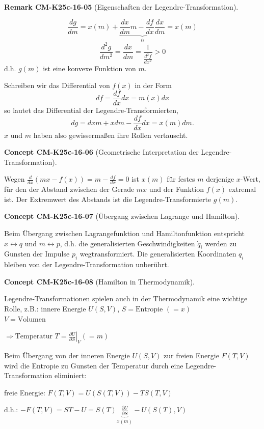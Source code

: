 \documentclass[10pt, letterpaper]{article}
\newcommand{\CustomHeading}[3]{%
  \par\medskip\noindent%
  \textbf{#1 #2} \textnormal{(#3)}.\enskip%
}
\newenvironment{REM}[2]{\CustomHeading{Remark}{#1}{#2}}{}
\newenvironment{CONC}[2]{\CustomHeading{Concept}{#1}{#2}}{}
\begin{document}
\begin{REM}{CM-K25c-16-05}{Eigenschaften der Legendre-Transformation}
\[
\frac{dg}{dm} = x(m) + \underbrace{\frac{dx}{dm}m - \frac{df}{dx}\frac{dx}{dm}}_{0} = x(m)
\]
\[
\frac{d^2g}{dm^2} = \frac{dx}{dm} = \frac{1}{\frac{d^2f}{dx^2}} > 0
\]
d.h. $g(m)$ ist eine konvexe Funktion von $m$.

Schreiben wir das Differential von $f(x)$ in der Form
\[
df = \frac{df}{dx}dx = m(x)dx
\]
so lautet das Differential der Legendre-Transformierten,
\[
dg = dxm + xdm - \frac{df}{dx}dx = x(m)dm.
\]
$x$ und $m$ haben also gewissermaßen ihre Rollen vertauscht.
\end{REM}

\begin{CONC}{CM-K25c-16-06}{Geometrische Interpretation der Legendre-Transformation}
Wegen $\frac{d}{dx}(mx-f(x))=m-\frac{df}{dx}=0$ ist $x(m)$ für festes $m$ derjenige $x$-Wert, für den der Abstand zwischen der Gerade $mx$ und der Funktion $f(x)$ extremal ist. Der Extremwert des Abstands ist die Legendre-Transformierte $g(m)$.
\end{CONC}

\begin{CONC}{CM-K25c-16-07}{Übergang zwischen Lagrange und Hamilton}
Beim Übergang zwischen Lagrangefunktion und Hamiltonfunktion entspricht $x \leftrightarrow q$ und $m \leftrightarrow p$, d.h. die generalisierten Geschwindigkeiten $\dot{q}_i$ werden zu Gunsten der Impulse $p_i$ wegtransformiert. Die generalisierten Koordinaten $q_i$ bleiben von der Legendre-Transformation unberührt.
\end{CONC}

\begin{CONC}{CM-K25c-16-08}{Hamilton in Thermodynamik}
Legendre-Transformationen spielen auch in der Thermodynamik eine wichtige Rolle, z.B.:
innere Energie $U(S,V)$, $S = \text{Entropie } (=x)$\\
$V = \text{Volumen}$

$\Rightarrow \text{Temperatur } T = \left.\frac{\partial U}{\partial S}\right|_V (=m)$

Beim Übergang von der inneren Energie $U(S,V)$ zur freien Energie $F(T,V)$ wird die Entropie zu Gunsten der Temperatur durch eine Legendre-Transformation eliminiert:

freie Energie: $F(T,V) = U(S(T,V)) - TS(T,V)$

d.h.: $-F(T,V) = ST-U = S(T)\underbrace{\frac{\partial U}{\partial S}}_{x(m)} - U(S(T),V)$
\end{CONC}
\end{document}
